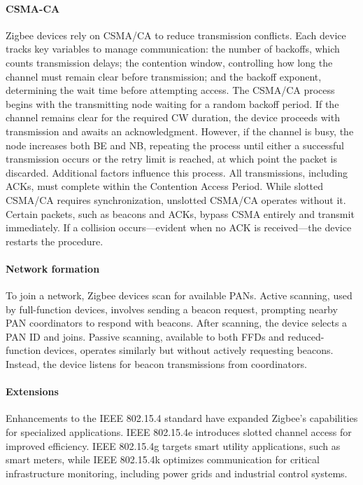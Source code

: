 \paragraph*{CSMA-CA}
Zigbee devices rely on CSMA/CA to reduce transmission conflicts. 
Each device tracks key variables to manage communication: the number of backoffs, which counts transmission delays; the contention window, controlling how long the channel must remain clear before transmission; and the backoff exponent, determining the wait time before attempting access.
The CSMA/CA process begins with the transmitting node waiting for a random backoff period. 
If the channel remains clear for the required CW duration, the device proceeds with transmission and awaits an acknowledgment. 
However, if the channel is busy, the node increases both BE and NB, repeating the process until either a successful transmission occurs or the retry limit is reached, at which point the packet is discarded.
Additional factors influence this process. 
All transmissions, including ACKs, must complete within the Contention Access Period. 
While slotted CSMA/CA requires synchronization, unslotted CSMA/CA operates without it. 
Certain packets, such as beacons and ACKs, bypass CSMA entirely and transmit immediately. 
If a collision occurs—evident when no ACK is received—the device restarts the procedure.

\paragraph*{Network formation}
To join a network, Zigbee devices scan for available PANs. 
Active scanning, used by full-function devices, involves sending a beacon request, prompting nearby PAN coordinators to respond with beacons. 
After scanning, the device selects a PAN ID and joins. 
Passive scanning, available to both FFDs and reduced-function devices, operates similarly but without actively requesting beacons.
Instead, the device listens for beacon transmissions from coordinators.

\paragraph*{Extensions}
Enhancements to the IEEE 802.15.4 standard have expanded Zigbee's capabilities for specialized applications.
IEEE 802.15.4e introduces slotted channel access for improved efficiency. 
IEEE 802.15.4g targets smart utility applications, such as smart meters, while IEEE 802.15.4k optimizes communication for critical infrastructure monitoring, including power grids and industrial control systems.

